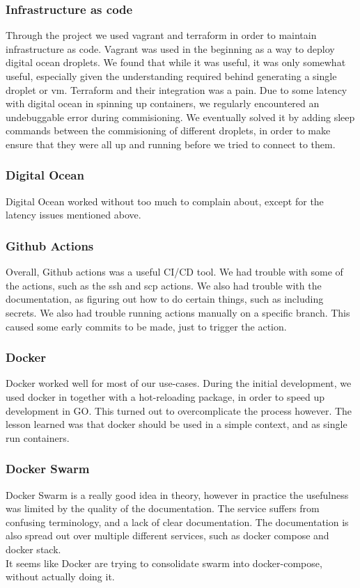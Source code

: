 \subsubsection{Infrastructure as code}
Through the project we used vagrant and terraform in order to maintain infrastructure as code.
Vagrant was used in the beginning as a way to deploy digital ocean droplets. We found that while it was useful,
it was only somewhat useful, especially given the understanding required behind generating a single droplet or vm.
Terraform and their integration was a pain. Due to some latency with digital ocean in spinning up containers, we regularly
encountered an undebuggable error during commisioning. We eventually solved it by adding sleep commands between the commisioning
of different droplets, in order to make ensure that they were all up and running before we tried to connect to them.\\

\subsubsection{Digital Ocean}
Digital Ocean worked without too much to complain about, except for the latency issues mentioned above.

\subsubsection{Github Actions}
Overall, Github actions was a useful CI/CD tool. We had trouble with some of the actions, such as the ssh and scp actions. 
We also had trouble with the documentation, as figuring out how to do certain things, such as including secrets.
We also had trouble running actions manually on a specific branch. This caused some early commits to be made, just to trigger
the action.\\

\subsubsection{Docker}
Docker worked well for most of our use-cases. During the initial development, we used docker in together with a hot-reloading
package, in order to speed up development in GO. This turned out to overcomplicate the process however. The lesson learned
was that docker should be used in a simple context, and as single run containers.

\subsubsection{Docker Swarm}
Docker Swarm is a really good idea in theory, however in practice the usefulness was limited by the quality of the documentation.
The service suffers from confusing terminology, and a lack of clear documentation. The documentation is also spread out over
multiple different services, such as docker compose and docker stack.\\ It seems like Docker are trying to consolidate swarm into
docker-compose, without actually doing it.

